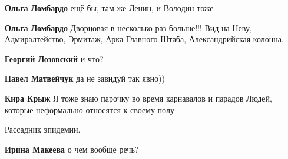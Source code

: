 \begin{itemize}
\begin{itemize}
\textbf{Ольга Ломбардо} ещё бы, там же Ленин, и Володин тоже

 
\textbf{Ольга Ломбардо} Дворцовая в несколько раз больше!!! Вид на Неву, Адмиралтейство, Эрмитаж, Арка Главного Штаба, Александрийская колонна.

 
\textbf{Георгий Лозовский} и что?

 
\textbf{Павел Матвейчук} да не завидуй так явно))

 
\textbf{Кира Крыж} Я тоже знаю парочку во время карнавалов и парадов Людей, которые неформально относятся к своему полу

 
Рассадник эпидемии.

 
\textbf{Ирина Макеева} о чем вообще речь?

 

\end{itemize}
\end{itemize}
